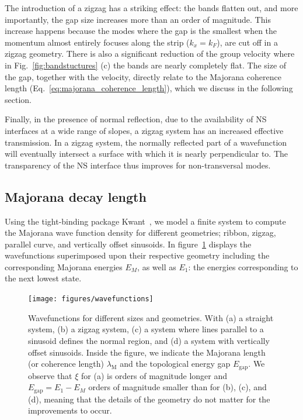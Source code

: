 			The introduction of a zigzag has a striking effect: the bands flatten out, and more importantly, the gap size increases more than an order of magnitude.
			This increase happens because the modes where the gap is the smallest when the momentum almost entirely focuses along the strip ($k_x=k_F$), are cut off in a zigzag geometry.
			There is also a significant reduction of the group velocity where in Fig.~\ref{fig:bandstuctures} (c) the bands are nearly completely flat.
			The size of the gap, together with the velocity, directly relate to the Majorana coherence length (Eq.~\eqref{eq:majorana_coherence_length}), which we discuss in the following section.

			Finally, in the presence of normal reflection, due to the availability of NS interfaces at a wide range of slopes, a zigzag system has an increased effective transmission.
			In a zigzag system, the normally reflected part of a wavefunction will eventually intersect a surface with which it is nearly perpendicular to.
			The transparency of the NS interface thus improves for non-transversal modes.

		\subsection{Majorana decay length}

			Using the tight-binding package Kwant~\cite{groth_kwant:_2014}, we model a finite system to compute the Majorana wave function density for different geometries; ribbon, zigzag, parallel curve, and vertically offset sinusoids.
			In figure~\ref{fig:wavefunctions} displays the wavefunctions superimposed upon their respective geometry including the corresponding Majorana energies $E_M$, as well as $E_1$: the energies corresponding to the next lowest state.

			\begin{figure}[!htb]
			\centering
			\texttt{[image: figures/wavefunctions]}
			\caption{Wavefunctions for different sizes and geometries.
			With (a) a straight system, (b) a zigzag system, (c) a system where lines parallel to a sinusoid defines the normal region, and (d) a system with vertically offset sinusoids.
			Inside the figure, we indicate the Majorana length (or coherence length) $\lambda_\textrm{M}$ and the topological energy gap $E_\textrm{gap}$.
			We observe that $\xi$ for (a) is orders of magnitude longer and $E_\textrm{gap} = E_\textrm{1} - E_M$ orders of magnitude smaller than for (b), (c), and (d), meaning that the details of the geometry do not matter for the improvements to occur.
			\label{fig:wavefunctions}}
			\end{figure}

